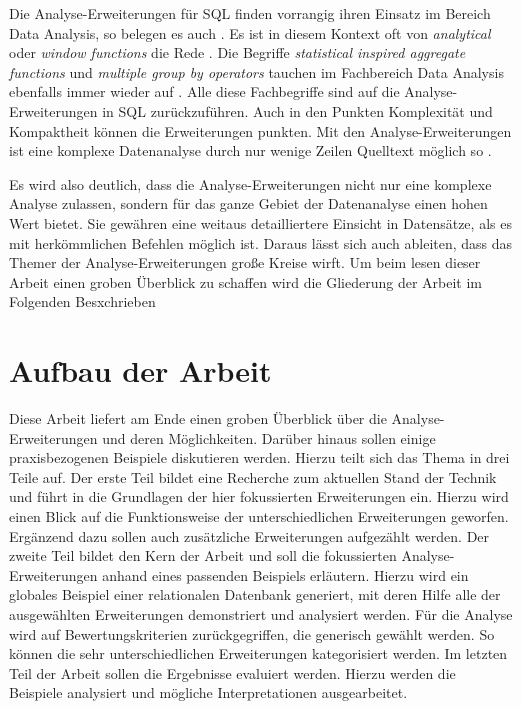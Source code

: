 Die Analyse-Erweiterungen für SQL finden vorrangig ihren Einsatz im Bereich Data
Analysis, so belegen es auch \citet[Kapitel 3]{FOTACHE2015243}. Es ist in diesem
Kontext oft von \textit{analytical} oder \textit{window functions} die Rede
\citep[vgl.][Kapitel 3]{FOTACHE2015243}. Die Begriffe \textit{statistical
inspired aggregate functions} und \textit{multiple group by operators} tauchen im
Fachbereich Data Analysis ebenfalls immer wieder auf \citep[vgl.][Kapitel 4.3]{FOTACHE2015243}.
Alle diese Fachbegriffe sind auf die Analyse-Erweiterungen in SQL zurückzuführen.
Auch in den Punkten Komplexität und Kompaktheit können die Erweiterungen punkten.
Mit den Analyse-Erweiterungen ist eine komplexe Datenanalyse durch nur wenige
Zeilen Quelltext möglich so \citet[Abstract]{Maue2022}.

Es wird also deutlich, dass die Analyse-Erweiterungen nicht nur eine komplexe Analyse
zulassen, sondern für das ganze Gebiet der Datenanalyse einen hohen Wert bietet.
Sie gewähren eine weitaus detailliertere Einsicht in Datensätze, als es mit
herkömmlichen Befehlen möglich ist. Daraus lässt sich auch ableiten, dass das
Themer der Analyse-Erweiterungen große Kreise wirft. Um beim lesen dieser Arbeit
einen groben Überblick zu schaffen wird die Gliederung der Arbeit im Folgenden Besxchrieben

\section{Aufbau der Arbeit}
\label{sec:aufbau_der_arbeit} Diese Arbeit liefert am Ende einen groben
Überblick über die Analyse-Erweiterungen und deren Möglichkeiten. Darüber hinaus
sollen einige praxisbezogenen Beispiele diskutieren werden. Hierzu teilt sich
das Thema in drei Teile auf. Der erste Teil bildet eine Recherche zum aktuellen Stand
der Technik und führt in die Grundlagen der hier fokussierten Erweiterungen ein.
Hierzu wird einen Blick auf die Funktionsweise der unterschiedlichen
Erweiterungen geworfen. Ergänzend dazu sollen auch zusätzliche Erweiterungen aufgezählt
werden. Der zweite Teil bildet den Kern der Arbeit und soll die fokussierten
Analyse-Erweiterungen anhand eines passenden Beispiels erläutern. Hierzu wird ein
globales Beispiel einer relationalen Datenbank generiert, mit deren Hilfe alle
der ausgewählten Erweiterungen demonstriert und analysiert werden. Für die Analyse
wird auf Bewertungskriterien zurückgegriffen, die generisch gewählt werden. So können
die sehr unterschiedlichen Erweiterungen kategorisiert werden. Im letzten Teil
der Arbeit sollen die Ergebnisse evaluiert werden. Hierzu werden die Beispiele analysiert
und mögliche Interpretationen ausgearbeitet.

